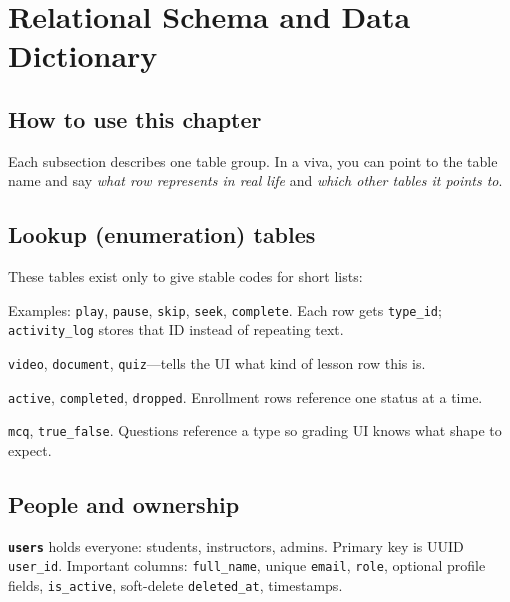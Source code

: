 
\chapter{Relational Schema and Data Dictionary}
\label{ch:dict}

\section{How to use this chapter}
Each subsection describes one table group. In a viva, you can point to the table name and say \textit{what row represents in real life} and \textit{which other tables it points to}.

\section{Lookup (enumeration) tables}
These tables exist only to give stable codes for short lists:

\begin{description}[style=nextline]
  \item[\texttt{activity\_types}]
  Examples: \texttt{play}, \texttt{pause}, \texttt{skip}, \texttt{seek}, \texttt{complete}. Each row gets \texttt{type\_id}; \texttt{activity\_log} stores that ID instead of repeating text.

  \item[\texttt{content\_types}]
  \texttt{video}, \texttt{document}, \texttt{quiz}---tells the UI what kind of lesson row this is.

  \item[\texttt{enrollment\_statuses}]
  \texttt{active}, \texttt{completed}, \texttt{dropped}. Enrollment rows reference one status at a time.

  \item[\texttt{question\_types}]
  \texttt{mcq}, \texttt{true\_false}. Questions reference a type so grading UI knows what shape to expect.
\end{description}

\section{People and ownership}
\textbf{\texttt{users}} holds everyone: students, instructors, admins. Primary key is UUID \texttt{user\_id}. Important columns: \texttt{full\_name}, unique \texttt{email}, \texttt{role}, optional profile fields, \texttt{is\_active}, soft-delete \texttt{deleted\_at}, timestamps.

